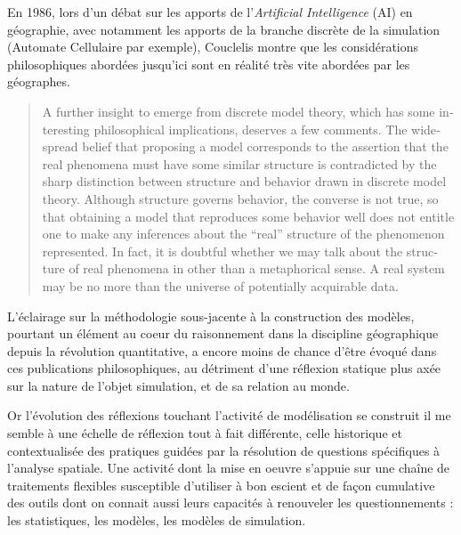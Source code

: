 En 1986, lors d'un débat sur les apports de l'\textit{Artificial Intelligence} (AI) en géographie, avec notamment les apports de la branche discrète de la simulation (Automate Cellulaire par exemple), Couclelis montre que les considérations philosophiques abordées jusqu'ici sont en réalité très vite abordées par les géographes.

\foreignblockquote{english}[\cite{Couclelis1986}]{A further insight to emerge from discrete model theory, which has some interesting philosophical implications, deserves a few comments. The widespread belief that proposing a model corresponds to the assertion that the real phenomena must have some similar structure is contradicted by the sharp distinction between structure and behavior drawn in discrete model theory. Although structure governs behavior, the converse is not true, so that obtaining a model that reproduces some behavior well does not entitle one to make any inferences about the \enquote{real} structure of the phenomenon represented. In fact, it is doubtful whether we may talk about the structure of real phenomena in other than a metaphorical sense. A real system may be no more than the universe of potentially acquirable data.}

L'éclairage sur la méthodologie sous-jacente à la construction des modèles, pourtant un élément au coeur du raisonnement dans la discipline géographique depuis la révolution quantitative, a encore moins de chance d'être évoqué dans ces publications philosophiques, au détriment d'une réflexion statique plus axée sur la nature de l'objet simulation, et de sa relation au monde.

Or l'évolution des réflexions touchant l'activité de modélisation se construit il me semble à une échelle de réflexion tout à fait différente, celle historique et  contextualisée des pratiques guidées par la résolution de questions spécifiques à l'analyse spatiale. Une activité dont la mise en oeuvre s'appuie sur une chaîne de traitements flexibles susceptible d'utiliser à bon escient et de façon cumulative des outils dont on connait aussi leurs capacités à renouveler les questionnements : les statistiques, les modèles, les modèles de simulation.



